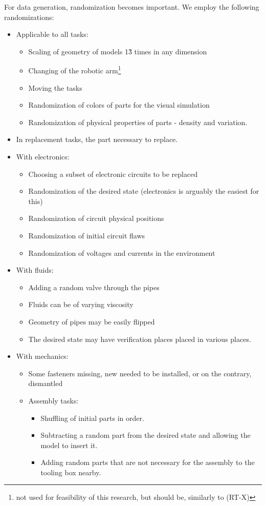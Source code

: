 \documentclass{article} %
\begin{document}
For data generation, randomization becomes important. We employ the following randomizations:
\begin{itemize}
    \item Applicable to all tasks:
    \begin{itemize}
        \item  Scaling of geometry of models 1\~3 times in any dimension
        \item  Changing of the robotic arm\footnote{not used for feasibility of this research, but should be, similarly to (RT-X)}
        \item Moving the tasks
        \item Randomization of colors of parts for the visual simulation
        \item Randomization of physical properties of parts - density and variation.
    \end{itemize}
    \item In replacement tasks, the part necessary to replace.
    \item With electronics: 
    \begin{itemize}
        \item Choosing a subset of electronic circuits to be replaced
        \item Randomization of the desired state (electronics is arguably the easiest for this)
        \item Randomization of circuit physical positions
        \item Randomization of initial circuit flaws
        \item Randomization of voltages and currents in the environment
    \end{itemize}
    \item With fluids:
    \begin{itemize}
        \item Adding a random valve through the pipes
        \item Fluids can be of varying viscosity
        \item Geometry of pipes may be easily flipped
        \item The desired state may have verification places placed in various places.
    \end{itemize}
\item With mechanics:
\begin{itemize}
    \item Some fasteners missing, new needed to be installed, or on the contrary, dismantled
\end{itemize}
\begin{itemize}
    \item Assembly tasks:
    \begin{itemize}
        \item Shuffling of initial parts in order.
        \item Subtracting a random part from the desired state and allowing the model to insert it.
        \item     Adding random parts that are not necessary for the assembly to the tooling box nearby.


\end{itemize}
\end{itemize}
\end{itemize}
\end{document}
